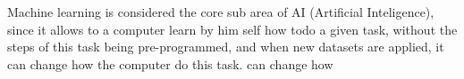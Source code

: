 Machine learning is considered the core sub area of AI (Artificial Inteligence), since it allows to a computer
learn by him self how todo a given task, without the steps of this task being pre-programmed, and when new datasets are applied, it can change how the computer do this task.  
can change how  


